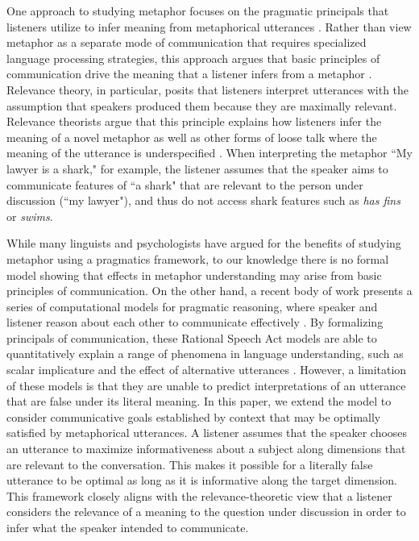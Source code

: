 \documentclass[10pt,letterpaper]{article}
\begin{document}
One approach to studying metaphor focuses on the pragmatic principals that listeners utilize to infer meaning from metaphorical utterances \cite{tendahl2008complementary, stern2000metaphor}. Rather than view metaphor as a separate mode of communication that requires specialized language processing strategies, this approach argues that basic principles of communication drive the meaning that a listener infers from a metaphor \cite{sperber2008deflationary}. Relevance theory, in particular, posits that listeners interpret utterances with the assumption that speakers produced them because they are maximally relevant. Relevance theorists argue that this principle explains how listeners infer the meaning of a novel metaphor as well as other forms of loose talk where the meaning of the utterance is underspecified \cite{wilson2002relevance, wilson2006metaphor, sperber1985loose}. When interpreting the metaphor ``My lawyer is a shark," for example, the listener assumes that the speaker aims to communicate features of  ``a shark" that are relevant to the person under discussion (``my lawyer"), and thus do not access shark features such as \emph{has fins} or \emph{swims}.

While many linguists and psychologists have argued for the benefits of studying metaphor using a pragmatics framework, to our knowledge there is no formal model showing that effects in metaphor understanding may arise from basic principles of communication. On the other hand, a recent body of work presents a series of computational models for pragmatic reasoning, where speaker and listener reason about each other to communicate effectively \cite{frank2012predicting, jager2009pragmatic}. By formalizing principals of communication, these Rational Speech Act models are able to quantitatively explain a range of phenomena in language understanding, such as scalar implicature and the effect of alternative utterances \cite{goodman2013knowledge, bergen2012s}. However, a limitation of these models is that they are unable to predict interpretations of an utterance that are false under its literal meaning. In this paper, we extend the model to consider communicative goals established by context that may be optimally satisfied by metaphorical utterances. A listener assumes that the speaker chooses an utterance to maximize informativeness about a subject along dimensions that are relevant to the conversation. This makes it possible for a literally false utterance to be optimal as long as it is informative along the target dimension. This framework closely aligns with the relevance-theoretic view that a listener considers the relevance of a meaning to the question under discussion in order to infer what the speaker intended to communicate. 
\end{document}
